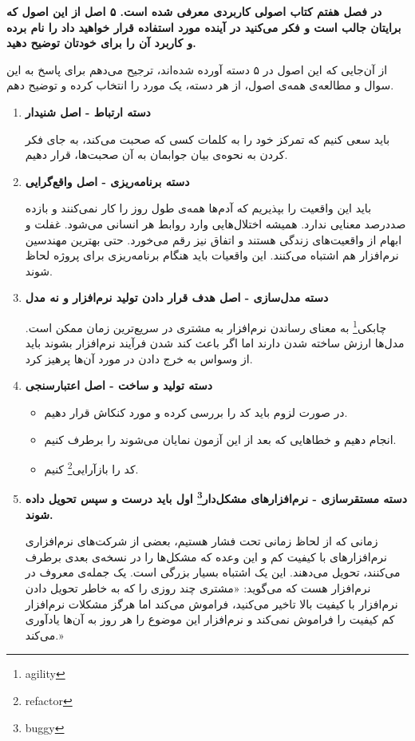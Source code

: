 
\textbf{در فصل هفتم کتاب اصولی کاربردی معرفی شده است. ۵ اصل از این اصول که برایتان جالب است و فکر می‌کنید در آینده مورد استفاده قرار خواهید داد را نام برده و کاربرد آن را برای خودتان توضیح دهید.}

از آن‌جایی که این اصول در ۵ دسته آورده شده‌اند، ترجیح می‌دهم برای پاسخ به این سوال و مطالعه‌ی همه‌ی اصول، از هر دسته، یک مورد را انتخاب کرده و توضیح دهم.
\begin{enumerate}
	\item 
	\textbf{دسته ارتباط - اصل شنیدار }
	
	باید سعی کنیم که تمرکز خود را به کلمات  کسی که صحبت می‌کند، به جای فکر کردن به نحوه‌ی بیان جوابمان به آن صحبت‌ها، قرار دهیم.
	\item 
	\textbf{دسته برنامه‌ریزی - اصل واقع‌گرایی}
	
	 باید این واقعیت را بپذیریم	 که آدم‌ها همه‌ی طول روز را کار نمی‌کنند و بازده صددرصد معنایی ندارد. همیشه اختلال‌هایی وارد روابط هر انسانی می‌شود. غفلت و ابهام از واقعیت‌های زندگی هستند و اتفاق نیز رقم می‌خورد. حتی بهترین مهندسین نرم‌افزار هم اشتباه می‌کنند. این واقعیات باید هنگام برنامه‌ریزی برای پروژه لحاظ شوند.
	\item 
	\textbf{دسته مدل‌سازی - اصل هدف قرار دادن تولید نرم‌افزار و نه مدل}
	
	 چابکی\footnote{agility} به معنای رساندن نرم‌افزار به مشتری در سریع‌ترین زمان ممکن است. مدل‌ها ارزش ساخته شدن دارند اما اگر باعث کند شدن فرآیند نرم‌افزار بشوند باید از وسواس به خرج دادن در مورد آن‌ها پرهیز کرد.
	 \item
	 \textbf{دسته تولید و ساخت - اصل اعتبارسنجی}
	  	\begin{itemize}
	  		\item در صورت لزوم باید کد را بررسی کرده و مورد کنکاش قرار دهیم.
	  		\item {} انجام دهیم و خطاهایی که بعد از این آزمون نمایان می‌شوند را برطرف کنیم.
	  		\item 
	  		کد را بازآرایی\footnote{refactor} کنیم.
	  	\end{itemize}
	 \item 
	 \textbf{دسته مستقرسازی - نرم‌افزارهای مشکل‌دار\footnote{buggy} اول باید درست  و سپس تحویل داده شوند.}
	 
	 زمانی که از لحاظ زمانی تحت فشار هستیم، بعضی از شرکت‌های نرم‌افزاری نرم‌افزارهای با کیفیت کم و این وعده که مشکل‌ها را در نسخه‌ی بعدی برطرف می‌کنند، تحویل می‌دهند. این یک اشتباه بسیار بزرگی است. یک جمله‌ی معروف در نرم‌افزار  هست که می‌گوید: «مشتری چند روزی را که به خاطر تحویل دادن نرم‌افزار با کیفیت بالا تاخیر می‌کنید، فراموش می‌کند اما هرگز مشکلات نرم‌افزار کم کیفیت را فراموش نمی‌کند و نرم‌افزار این موضوع را هر روز به آن‌ها یادآوری می‌کند.»
\end{enumerate}